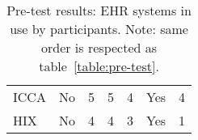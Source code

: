 \begin{table}[!t]
{\begin{tabular}{lcccccl}
            ICCA                & No              & 5                                                                     & 5                                                                          & 4                                                                         & Yes                                                               & 4                                                                                        \\
            HIX                 & No              & 4                                                                     & 4                                                                          & 3                                                                         & Yes                                                               & 1                                                                                       
            \end{tabular}%
            }
            \caption{Pre-test results: EHR systems in use by participants. Note: same order is respected as table~\ref{table:pre-test}.}\label{table:pre-test-ehr}
        \end{table}